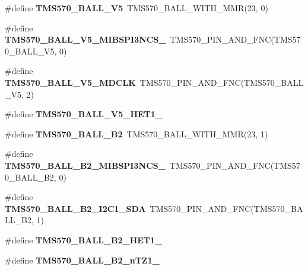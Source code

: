 \begin{DoxyCompactItemize}
\item 
\mbox{\label{tms570lc4357-pins_8h_a33cea185253bfd2f8673d380af8dd297}} 
\#define {\bfseries T\+M\+S570\+\_\+\+B\+A\+L\+L\+\_\+\+V5}~T\+M\+S570\+\_\+\+B\+A\+L\+L\+\_\+\+W\+I\+T\+H\+\_\+\+M\+MR(23, 0)
\item 
\mbox{\label{tms570lc4357-pins_8h_aa72f67e4949a7f273517db9aa68e72ee}} 
\#define {\bfseries T\+M\+S570\+\_\+\+B\+A\+L\+L\+\_\+\+V5\+\_\+\+M\+I\+B\+S\+P\+I3\+N\+C\+S\+\_}~T\+M\+S570\+\_\+\+P\+I\+N\+\_\+\+A\+N\+D\+\_\+\+F\+NC(T\+M\+S570\+\_\+\+B\+A\+L\+L\+\_\+\+V5, 0)
\item 
\mbox{\label{tms570lc4357-pins_8h_a728407fb1b127d475568aae25287cf49}} 
\#define {\bfseries T\+M\+S570\+\_\+\+B\+A\+L\+L\+\_\+\+V5\+\_\+\+M\+D\+C\+LK}~T\+M\+S570\+\_\+\+P\+I\+N\+\_\+\+A\+N\+D\+\_\+\+F\+NC(T\+M\+S570\+\_\+\+B\+A\+L\+L\+\_\+\+V5, 2)
\item 
\#define {\bfseries T\+M\+S570\+\_\+\+B\+A\+L\+L\+\_\+\+V5\+\_\+\+H\+E\+T1\+\_}
\item 
\mbox{\label{tms570lc4357-pins_8h_a3c413a4eec516f96f5b78e1d709fdd92}} 
\#define {\bfseries T\+M\+S570\+\_\+\+B\+A\+L\+L\+\_\+\+B2}~T\+M\+S570\+\_\+\+B\+A\+L\+L\+\_\+\+W\+I\+T\+H\+\_\+\+M\+MR(23, 1)
\item 
\mbox{\label{tms570lc4357-pins_8h_aca9b2b8e392aa5928db939e10640f84e}} 
\#define {\bfseries T\+M\+S570\+\_\+\+B\+A\+L\+L\+\_\+\+B2\+\_\+\+M\+I\+B\+S\+P\+I3\+N\+C\+S\+\_}~T\+M\+S570\+\_\+\+P\+I\+N\+\_\+\+A\+N\+D\+\_\+\+F\+NC(T\+M\+S570\+\_\+\+B\+A\+L\+L\+\_\+\+B2, 0)
\item 
\mbox{\label{tms570lc4357-pins_8h_a698f934ce8a765efb58877a7419707fd}} 
\#define {\bfseries T\+M\+S570\+\_\+\+B\+A\+L\+L\+\_\+\+B2\+\_\+\+I2\+C1\+\_\+\+S\+DA}~T\+M\+S570\+\_\+\+P\+I\+N\+\_\+\+A\+N\+D\+\_\+\+F\+NC(T\+M\+S570\+\_\+\+B\+A\+L\+L\+\_\+\+B2, 1)
\item 
\#define {\bfseries T\+M\+S570\+\_\+\+B\+A\+L\+L\+\_\+\+B2\+\_\+\+H\+E\+T1\+\_}
\item 
\#define {\bfseries T\+M\+S570\+\_\+\+B\+A\+L\+L\+\_\+\+B2\+\_\+n\+T\+Z1\+\_}
\item 
\mbox{\label{tms570lc4357-pins_8h_a68948ca9f3c53538b8cfc25cfa0f0e82}} 

\end{DoxyCompactItemize}
